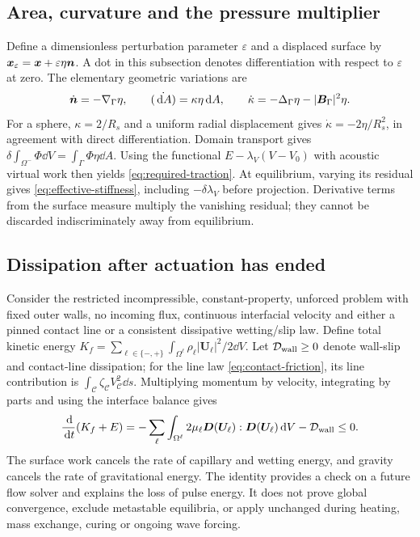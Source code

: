 \subsection{Area, curvature and the pressure multiplier}
Define a dimensionless perturbation parameter $\varepsilon$ and a displaced
surface by $\bm x_\varepsilon=\bm x+\varepsilon\eta\bm n$. A dot in this
subsection denotes differentiation with respect to $\varepsilon$ at zero.
The elementary geometric variations are
\begin{equation}
 \dot{\bm n}=-\nabla_\Gamma\eta,\qquad
 \dot{(\,\mathrm d A)}=\kappa\eta\,\mathrm d A,\qquad
 \dot\kappa=-\Delta_\Gamma\eta-|\bm B_\Gamma|^2\eta.
 \label{eq:geometric-variations}
\end{equation}
For a sphere, $\kappa=2/R_s$ and a uniform radial displacement gives
$\dot\kappa=-2\eta/R_s^2$, in agreement with direct differentiation. Domain
transport gives $\delta\int_{\Omega^-}\Phi\dd V=\int_\Gamma\Phi\eta\dd A$.
Using the functional $E-\lambda_V(V-V_0)$ with acoustic virtual work then
yields \cref{eq:required-traction}. At equilibrium, varying its residual gives
\cref{eq:effective-stiffness}, including $-\delta\lambda_V$ before projection.
Derivative terms from the surface measure multiply the vanishing residual;
they cannot be discarded indiscriminately away from equilibrium.

\subsection{Dissipation after actuation has ended}
Consider the restricted incompressible, constant-property, unforced problem
with fixed outer walls, no incoming flux, continuous interfacial velocity and
either a pinned contact line or a consistent dissipative wetting/slip law.
Define total kinetic energy
$K_f=\sum_{\ell\in\{-,+\}}\int_{\Omega^\ell}
\rho_\ell|\bm U_\ell|^2/2\dd V$. Let $\mathcal D_{\rm wall}\geq0$ denote
wall-slip and contact-line dissipation; for the line law
\cref{eq:contact-friction}, its line contribution is
$\int_{\mathcal C}\zeta_{\mathcal C}V_{\mathcal C}^2\dd s$. Multiplying
momentum by velocity, integrating by parts and using the interface balance
gives
\begin{equation}
 \frac{\,\mathrm d}{\,\mathrm d t}(K_f+E)
 =-\sum_\ell\int_{\Omega^\ell}2\mu_\ell
                  \bm D(\bm U_\ell):\bm D(\bm U_\ell)\,\mathrm d V
   -\mathcal D_{\rm wall}\leq0.
 \label{eq:passive-energy-decay}
\end{equation}
The surface work cancels the rate of capillary and wetting energy, and gravity
cancels the rate of gravitational energy. The identity provides a check on a
future flow solver and explains the loss of pulse energy. It does not prove
global convergence, exclude metastable equilibria, or apply unchanged during
heating, mass exchange, curing or ongoing wave forcing.

